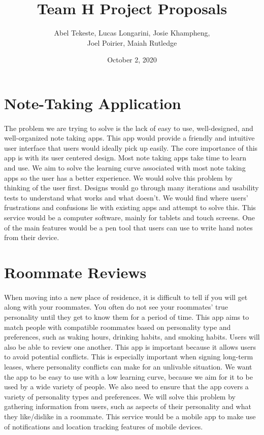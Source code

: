 \documentclass{article}
\title{Team H Project Proposals}
\author{Abel Tekeste, Lucas Longarini, Josie Khampheng,
\\Joel Poirier, Maiah Rutledge}
\date{October 2, 2020}
\begin{document}
\maketitle

\section{Note-Taking Application}
\paragraph{}
The problem we are trying to solve is the lack of easy to use, well-designed, and well-organized note taking apps. This app would provide a friendly and intuitive user interface that users would ideally pick up easily. The core importance of this app is with its user centered design. Most note taking apps take time to learn and use. We aim to solve the learning curve associated with most note taking apps so the user has a better experience. We would solve this problem by thinking of the user first. Designs would go through many iterations and usability tests to understand what works and what doesn’t. We would find where users' frustrations and confusions lie with existing apps and attempt to solve this. This service would be a computer software, mainly for tablets and touch screens. One of the main features would be a pen tool that users can use to write hand notes from their device.

\section{Roommate Reviews}
\paragraph{}
When moving into a new place of residence, it is difficult to tell if you will get along with your roommates.  You often do not see your roommates' true personality until they get to know them for a period of time. This app aims to match people with compatible roommates based on personality type and preferences, such as waking hours, drinking habits, and smoking habits. Users will also be able to review one another.
This app is important because it allows users to avoid potential conflicts. This is especially important when signing long-term leases, where personality conflicts can make for an unlivable situation.
We want the app to be easy to use with a low learning curve, because we aim for it to be used by a wide variety of people. We also need to ensure that the app covers a variety of personality types and preferences. We will solve this problem by gathering information from users, such as aspects of their personality and what they like/dislike in a roommate. 
This service would be a mobile app to make use of notifications and location tracking features of mobile devices.
\end{document}
